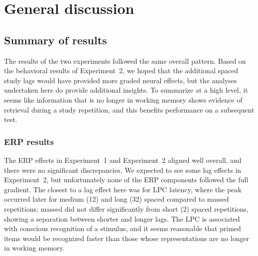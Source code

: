 
\chapter{General discussion}


\section{Summary of results}


The results of the two experiments followed the same overall pattern.  Based on the behavioral results of Experiment~2, we hoped that the additional spaced study lags would have provided more graded neural effects, but the analyses undertaken here do provide additional insights.  To summarize at a high level, it seems like information that is no longer in working memory shows evidence of retrieval during a study repetition, and this benefits performance on a subsequent test.

\subsection{ERP results}


The ERP effects in Experiment~1 and Experiment~2 aligned well overall, and there were no significant discrepancies.  We expected to see some lag effects in Experiment~2, but unfortunately none of the ERP components followed the full gradient.  The closest to a lag effect here was for LPC latency, where the peak occurred later for medium (12) and long (32) spaced compared to massed repetitions; massed did not differ significantly from short (2) spaced repetitions, showing a separation between shorter and longer lags.  The LPC is associated with conscious recognition of a stimulus, and it seems reasonable that primed items would be recognized faster than those whose representations are no longer in working memory.

